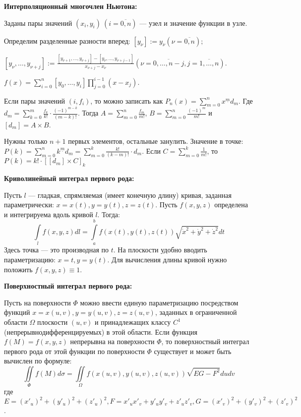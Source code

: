 \textbf{Интерполяционный многочлен Ньютона:}

Заданы пары значений $(x_i,y_i)\ (i=\overline{0,n})$ --- узел и значение функции в узле.

Определим разделенные разности вперед: $[y_{\nu}]:=y_{\nu} (\nu=\overline{0,n});$

$[y_{\nu}, \ldots, y_{\nu+j}]:=\frac{[y_{\nu+1},\ldots,y_{\nu+j}] - [y_{\nu},\ldots,y_{\nu+j-1}]}{x_{\nu+j}-x_{\nu}} (\nu=\overline{0,\ldots,n-j},j=\overline{1,\ldots,n})$.

$f(x)=\sum\limits_{i=0}^{n}[y_0,\dots,y_i]\prod\limits_{j=0}^{i-1}(x-x_j)$.

Если пары значений $(i, f_i)$, то можно записать как $P_n(x) = \sum\limits_{m = 0}^{n} {x^{\underline{m}}d_m}$.
Где $d_m = \sum\limits_{k = 0}^{m} {\frac{f_k}{k!} \cdot \frac{(-1)^{m-k}}{(m-k)!}}$. Тогда $A = \sum\limits_{m=0}^{n} {\frac{f_m}{m!}}$,
$B = \sum\limits_{m=0}^{n} {\frac{(-1)^m}{m!}}$ и $[d_m] = A \times B$. 

Нужны только $n + 1$ первых элементов, остальные занулить. Значение в точке: $P(k) = \sum\limits_{m=0}^{n} {k^{\underline{m}} d_m} = \sum\limits_{m=0}^{k} {\frac{k!}{(k - m)!} \cdot d_m}$.
Если $C = \sum\limits_{m=0}^{k} {\frac{1}{m!}}$, то $P(k) = k! \cdot [[d_m] \times C]_k$


\textbf{Криволинейный интеграл первого рода:}

Пусть $l$ --- гладкая, спрямляемая (имеет конечную длину) кривая, заданная параметрически: $x = x(t), y = y(t), z = z(t)$.
Пусть $f(x, y, z)$ определена и интегрируема вдоль кривой $l$. Тогда:
$$
	\int\limits_l f(x, y, z)dl = \int\limits_a^b f(x(t), y(t), z(t)) \sqrt{\dot{x}^2 + \dot{y}^2 + \dot{z}^2} dt
$$
Здесь точка --- это производная по $t$. На плоскости удобно вводить параметризацию: $x = t, y = y(t)$.
Для вычисления длины кривой нужно положить $f(x, y, z) \equiv 1$.

\textbf{Поверхностный интеграл первого рода:}

Пусть на поверхности $\Phi$ можно ввести единую параметризацию посредством функций $x = x(u, v), y = y(u, v), z = z(u, v)$,
заданных в ограниченной области $\Omega$ плоскости $(u,v)$ и принадлежащих классу $C^1$ (непрерывнодифференцируемых) в этой области.
Если функция $f(M) = f(x, y, z)$ непрерывна на поверхности $\Phi$, то поверхностный интеграл первого рода от этой функции по поверхности $\Phi$
существует и может быть вычислен по формуле:
$$
	\iint\limits_{\Phi}f(M)d\sigma = \iint\limits_{\Omega} f(x(u, v), y(u, v), z(u, v)) \sqrt{EG - F^2} du dv
$$
где $E = (x'_u)^2 + (y'_u)^2 + (z'_u)^2, F = x'_u x'_v + y'_u y'_v + z'_u z'_v, G = (x'_v)^2 + (y'_v)^2 + (z'_v)^2$.


